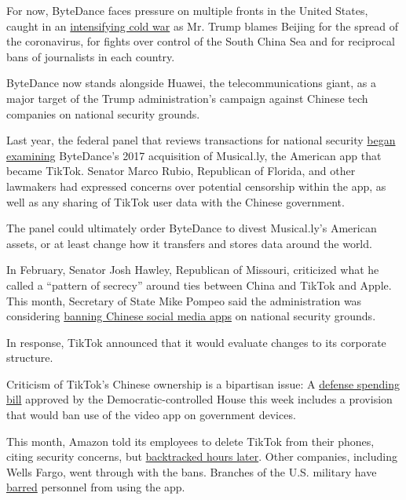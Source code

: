 For now, ByteDance faces pressure on multiple fronts in the United
States, caught in an
\href{https://www.nytimes3xbfgragh.onion/2020/07/22/world/asia/us-china-cold-war.html}{intensifying
cold war} as Mr. Trump blames Beijing for the spread of the coronavirus,
for fights over control of the South China Sea and for reciprocal bans
of journalists in each country.

ByteDance now stands alongside Huawei, the telecommunications giant, as
a major target of the Trump administration's campaign against Chinese
tech companies on national security grounds.

Last year, the federal panel that reviews transactions for national
security
\href{https://www.nytimes3xbfgragh.onion/2019/11/01/technology/tiktok-national-security-review.html}{began
examining} ByteDance's 2017 acquisition of Musical.ly, the American app
that became TikTok. Senator Marco Rubio, Republican of Florida, and
other lawmakers had expressed concerns over potential censorship within
the app, as well as any sharing of TikTok user data with the Chinese
government.

The panel could ultimately order ByteDance to divest Musical.ly's
American assets, or at least change how it transfers and stores data
around the world.

In February, Senator Josh Hawley, Republican of Missouri, criticized
what he called a ``pattern of secrecy'' around ties between China and
TikTok and Apple. This month, Secretary of State Mike Pompeo said the
administration was considering
\href{https://www.politico.com/news/2020/07/07/mike-pompeo-tiktok-ban-350384}{banning
Chinese social media apps} on national security grounds.

In response, TikTok announced that it would evaluate changes to its
corporate structure.

Criticism of TikTok's Chinese ownership is a bipartisan issue: A
\href{https://thehill.com/policy/technology/508412-house-approved-defense-bill-would-ban-tiktok-from-government-devices}{defense
spending bill} approved by the Democratic-controlled House this week
includes a provision that would ban use of the video app on government
devices.

This month, Amazon told its employees to delete TikTok from their
phones, citing security concerns, but
\href{https://www.nytimes3xbfgragh.onion/2020/07/10/technology/tiktok-amazon-security-risk.html}{backtracked
hours later}. Other companies, including Wells Fargo, went through with
the bans. Branches of the U.S. military have
\href{https://www.nytimes3xbfgragh.onion/2020/01/04/us/tiktok-pentagon-military-ban.html}{barred}
personnel from using the app.

